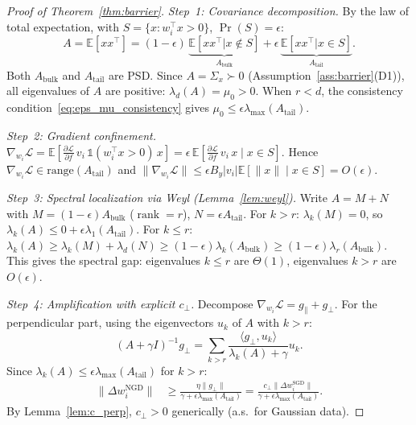 \documentclass{article}
\providecommand{\E}{\mathbb{E}}
\providecommand{\norm}[1]{\lVert #1 \rVert}
\DeclareMathOperator{\rank}{rank}
\theoremstyle{plain}
\theoremstyle{definition}
\theoremstyle{remark}
\begin{document}
\begin{proof}[Proof of Theorem~\ref{thm:barrier}]
\emph{Step~1: Covariance decomposition.}
By the law of total expectation, with $S = \{x : w_i^\top x > 0\}$, $\Pr(S) = \epsilon$:
\begin{equation}
    A = \E[xx^\top] = (1 - \epsilon)\,\underbrace{\E[xx^\top|x\notin S]}_{A_{\mathrm{bulk}}} + \epsilon\,\underbrace{\E[xx^\top|x \in S]}_{A_{\mathrm{tail}}}.
\end{equation}
Both $A_{\mathrm{bulk}}$ and $A_{\mathrm{tail}}$ are PSD. Since $A = \Sigma_x \succ 0$ (Assumption~\ref{ass:barrier}(D1)), all eigenvalues of $A$ are positive: $\lambda_d(A) = \mu_0 > 0$. When $r < d$, the consistency condition~\eqref{eq:eps_mu_consistency} gives $\mu_0 \leq \epsilon\lambda_{\max}(A_{\mathrm{tail}})$.

\emph{Step~2: Gradient confinement.}
$\nabla_{w_i}\mathcal{L} = \E[\frac{\partial\mathcal{L}}{\partial f}\,v_i\,\mathbb{1}(w_i^\top x > 0)\,x] = \epsilon\,\E[\frac{\partial\mathcal{L}}{\partial f}\,v_i\,x \mid x \in S]$.
Hence $\nabla_{w_i}\mathcal{L} \in \mathrm{range}(A_{\mathrm{tail}})$ and $\norm{\nabla_{w_i}\mathcal{L}} \leq \epsilon B_y |v_i| \E[\norm{x} \mid x \in S] = O(\epsilon)$.

\emph{Step~3: Spectral localization via Weyl (Lemma~\ref{lem:weyl}).}
Write $A = M + N$ with $M = (1-\epsilon)A_{\mathrm{bulk}}$ ($\rank = r$), $N = \epsilon A_{\mathrm{tail}}$. For $k > r$: $\lambda_k(M) = 0$, so $\lambda_k(A) \leq 0 + \epsilon\lambda_1(A_{\mathrm{tail}})$. For $k \leq r$: $\lambda_k(A) \geq \lambda_k(M) + \lambda_d(N) \geq (1-\epsilon)\lambda_k(A_{\mathrm{bulk}}) \geq (1-\epsilon)\lambda_r(A_{\mathrm{bulk}})$. This gives the spectral gap: eigenvalues $k \leq r$ are $\Theta(1)$, eigenvalues $k > r$ are $O(\epsilon)$.

\emph{Step~4: Amplification with explicit $c_\perp$.}
Decompose $\nabla_{w_i}\mathcal{L} = g_\parallel + g_\perp$. For the perpendicular part, using the eigenvectors $u_k$ of $A$ with $k > r$:
\begin{equation}
    (A+\gamma I)^{-1}g_\perp = \sum_{k>r} \frac{\langle g_\perp, u_k\rangle}{\lambda_k(A) + \gamma} u_k.
\end{equation}
Since $\lambda_k(A) \leq \epsilon\lambda_{\max}(A_{\mathrm{tail}})$ for $k > r$:
\begin{align}
    \norm{\Delta w_i^{\mathrm{NGD}}} &\geq \frac{\eta\norm{g_\perp}}{\gamma + \epsilon\lambda_{\max}(A_{\mathrm{tail}})} = \frac{c_\perp\norm{\Delta w_i^{\mathrm{SGD}}}}{\gamma + \epsilon\lambda_{\max}(A_{\mathrm{tail}})}.
\end{align}
By Lemma~\ref{lem:c_perp}, $c_\perp > 0$ generically (a.s.\ for Gaussian data).


\end{proof}
\end{document}
